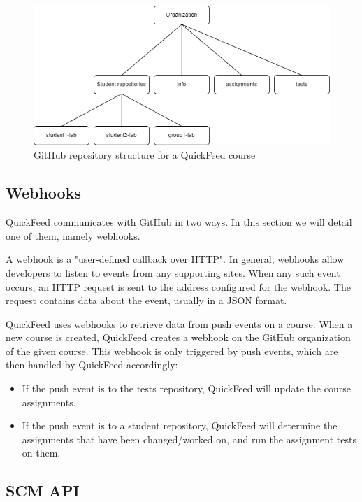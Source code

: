 \begin{figure}[ht]
    \centering
    \includegraphics[width=\textwidth]{photos/qf-repository-structure.png}
    \caption{GitHub repository structure for a QuickFeed course}
    \label{fig:qf-repository-structure}
\end{figure}

\subsection{Webhooks}

QuickFeed communicates with GitHub in two ways.
In this section we will detail one of them, namely webhooks.

A webhook is a "user-defined callback over HTTP". %
In general, webhooks allow developers to listen to events from any supporting sites.
When any such event occurs, an HTTP request is sent to the address configured for the webhook.
The request contains data about the event, usually in a JSON format.

QuickFeed uses webhooks to retrieve data from push events on a course.
When a new course is created, QuickFeed creates a webhook on the GitHub organization of the given course.
This webhook is only triggered by push events, which are then handled by QuickFeed accordingly:

\begin{itemize}
    \item If the push event is to the tests repository, QuickFeed will update the course assignments.
    \item If the push event is to a student repository, QuickFeed will determine the assignments that have been changed/worked on, 
    and run the assignment tests on them.
\end{itemize}

\subsection{SCM API}

